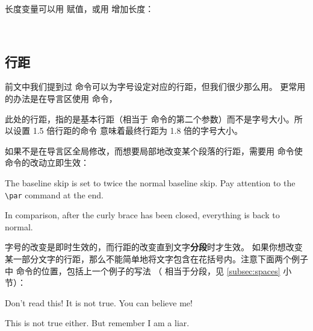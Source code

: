 长度变量可以用  赋值，或用  增加长度：
\begin{command}
 \\
\end{command}

\subsection{行距}\label{subsec:linespread}

前文中我们提到过  命令可以为字号设定对应的行距，但我们很少那么用。
更常用的办法是在导言区使用  命令，
\begin{command}
\end{command}

此处的行距，指的是基本行距（相当于  命令的第二个参数）而不是字号大小。所以设置 1.5 倍行距的命令 
意味着最终行距为 1.8 倍的字号大小。

如果不是在导言区全局修改，而想要局部地改变某个段落的行距，需要用  命令使  命令的改动立即生效：
\begin{example}
{\linespread{2.0}\selectfont
The baseline skip is set to twice
the normal baseline skip. 
Pay attention to the \verb|\par|
command at the end. \par}

In comparison, after the
curly brace has been closed,
everything is back to normal.
\end{example}

字号的改变是即时生效的，而行距的改变直到文字\textbf{分段}时才生效。
如果你想改变某一部分文字的行距，那么不能简单地将文字包含在花括号内。注意下面两个例子中  命令的位置，包括上一个例子的写法
（ 相当于分段，见 \ref{subsec:spaces} 小节）：
\begin{example}
{\Large Don't read this!
 It is not true.
 You can believe me!\par}
\end{example}

\begin{example}
{\Large This is not true either.
But remember I am a liar.}\par
\end{example}

